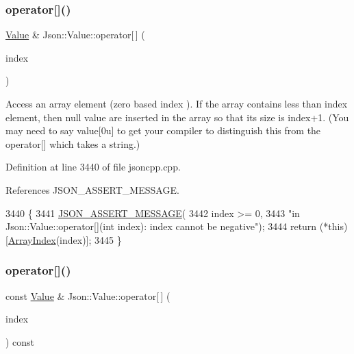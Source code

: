 \subsubsection{\texorpdfstring{operator[]()}{operator[]()}\hspace{0.1cm}{\footnotesize\ttfamily [2/9]}}
{\footnotesize\ttfamily \hyperlink{class_json_1_1_value}{Value} \& Json\+::\+Value\+::operator\mbox{[}$\,$\mbox{]} (\begin{DoxyParamCaption}\item[{int}]{index }\end{DoxyParamCaption})}

Access an array element (zero based index ). If the array contains less than index element, then null value are inserted in the array so that its size is index+1. (You may need to say \textquotesingle{}value\mbox{[}0u\mbox{]}\textquotesingle{} to get your compiler to distinguish this from the operator\mbox{[}\mbox{]} which takes a string.) 

Definition at line 3440 of file jsoncpp.\+cpp.



References J\+S\+O\+N\+\_\+\+A\+S\+S\+E\+R\+T\+\_\+\+M\+E\+S\+S\+A\+GE.


\begin{DoxyCode}
3440                                   \{
3441   \hyperlink{json_8h_ad7facdeeca0f495765e3b204c265eadb}{JSON\_ASSERT\_MESSAGE}(
3442       index >= 0,
3443       \textcolor{stringliteral}{"in Json::Value::operator[](int index): index cannot be negative"});
3444   \textcolor{keywordflow}{return} (*\textcolor{keyword}{this})[\hyperlink{class_json_1_1_value_a184a91566cccca7b819240f0d5561c7d}{ArrayIndex}(index)];
3445 \}
\end{DoxyCode}
\mbox{\label{class_json_1_1_value_a46607236038b29695ed80c15895271e4}} 
\subsubsection{\texorpdfstring{operator[]()}{operator[]()}\hspace{0.1cm}{\footnotesize\ttfamily [3/9]}}
{\footnotesize\ttfamily const \hyperlink{class_json_1_1_value}{Value} \& Json\+::\+Value\+::operator\mbox{[}$\,$\mbox{]} (\begin{DoxyParamCaption}\item[{\hyperlink{class_json_1_1_value_a184a91566cccca7b819240f0d5561c7d}{Array\+Index}}]{index }\end{DoxyParamCaption}) const}

